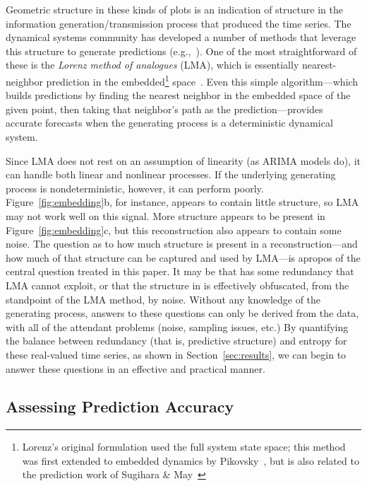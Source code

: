Geometric structure in these kinds of plots is an indication of
structure in the information generation/transmission process that
produced the time series.  The dynamical systems community has
developed a number of methods that leverage this structure to generate
predictions (e.g.,~\cite{weigend-book,casdagli-eubank92,Smith199250}).
One of the most straightforward of these is the \emph{Lorenz method of
  analogues} (LMA), which is essentially nearest-neighbor prediction
in the embedded\footnote{Lorenz's original formulation used the full
  system state space;
%
%
this method was first extended to embedded dynamics by
Pikovsky~\cite{pikovsky86-sov}, but is also related to the prediction
work of Sugihara \& May~\cite{sugihara90}}
space~\cite{lorenz-analogues}.  Even this simple algorithm---which
builds predictions by finding the nearest neighbor in the embedded
space of the given point, then taking that neighbor's path as the
prediction---provides accurate forecasts when the generating process
is a deterministic dynamical system.

Since LMA does not rest on an assumption of linearity (as ARIMA models
do), it can handle both linear and nonlinear processes.  If the
underlying generating process is nondeterministic, however, it can
perform poorly.  Figure~\ref{fig:embedding}b, for instance, appears to
contain little structure, so LMA may not work well on this signal.
More structure appears to be present in Figure~\ref{fig:embedding}c,
but this reconstruction also appears to contain some noise.  The
question as to how much structure is present in a reconstruction---and
how much of that structure can be captured and used by LMA---is
apropos of the central question treated in this paper.  It may be that
\gcc has some redundancy that LMA cannot exploit, or that the
structure in \svdfive is effectively obfuscated, from the standpoint
of the LMA method, by noise.  Without any knowledge of the generating
process, answers to these questions can only be derived from the data,
with all of the attendant problems (noise, sampling issues, etc.)  By
quantifying the balance between redundancy (that is, predictive
structure) and entropy for these real-valued time series, as shown in
Section~\ref{sec:results}, we can begin to answer these questions in
an effective and practical manner.


\subsection{Assessing Prediction Accuracy}
\label{sec:accuracy}

